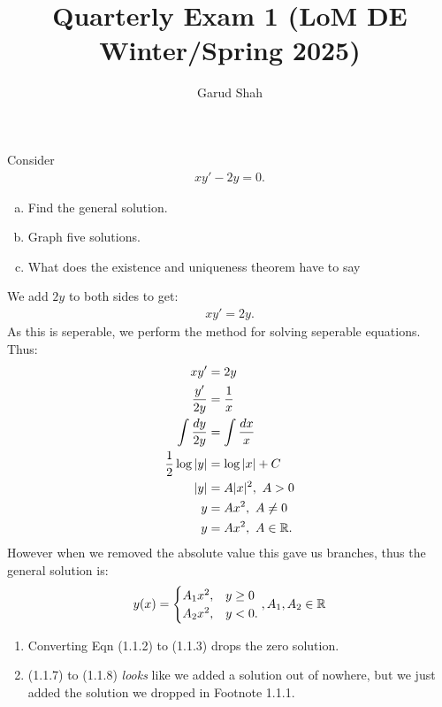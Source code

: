 \documentclass{article}
\title{Quarterly Exam 1 (LoM DE Winter/Spring 2025)}
\author{Garud Shah}
\begin{document}
    \maketitle
    \newpage
    \begin{problem}[Problem 1]
        Consider 
        \begin{align}
            xy'-2y=0.
        \end{align}
        \begin{enumerate}[(a)]
            \item Find the general solution.
            \item Graph five solutions.
            \item What does the existence and uniqueness theorem have to say 
        \end{enumerate}
    \end{problem}
    \begin{solution}[Solution 1a]
        We add $2y$ to both sides to get:
        \begin{align}
            xy' = 2y.
        \end{align}
        As this is seperable, we perform the method for solving seperable equations. Thus:
        \begin{align}
            xy' &= 2y \\ 
            \dfrac{y'}{2y} &= \dfrac{1}{x} \\ 
            \int \dfrac{dy}{2y} &= \int \dfrac{dx}{x} \\ 
            \dfrac{1}{2} \log |y| &= \log |x| + C\\ 
            |y| &= A|x|^2, \text{ }A >0 \\ 
            y &= Ax^2, \text{ } A \ne 0 \\ 
            y &= Ax^2, \text{ } A \in \mathbb R.
        \end{align}
        However when we removed the absolute value this gave us branches, thus the general solution is:
        \begin{align}
            y(x) =
            \begin{cases}
                A_1x^2, &y \ge 0 \\ 
                A_2x^2, &y < 0.            
            \end{cases},A_1, A_2 \in \mathbb R
        \end{align}
        \begin{remark*}[Footnotes] \hfill 
            \begin{enumerate}
                \item Converting Eqn (1.1.2) to (1.1.3) drops the zero solution.
                \item (1.1.7) to (1.1.8) \textit{looks} like we added a solution out of nowhere, but we just added the solution we dropped in Footnote 1.1.1.
            \end{enumerate}
        \end{remark*}
    \end{solution}
\end{document}
